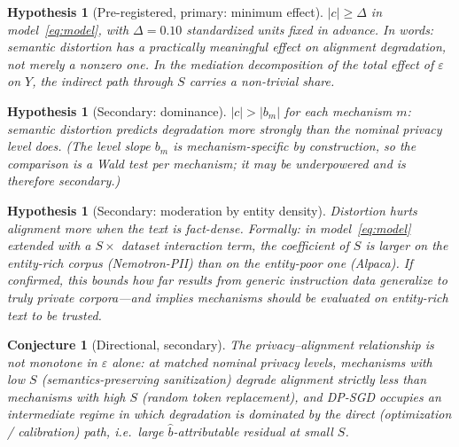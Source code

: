 \documentclass{article}
\theoremstyle{definition}
\theoremstyle{plain}
\newtheorem{conjecture}[theorem]{Conjecture}
\newtheorem{hypothesis}[theorem]{Hypothesis}
\theoremstyle{remark}
\newcommand{\eps}{\varepsilon}
\newcommand{\Sdist}{S}
\begin{document}
\begin{hypothesis}[Pre-registered, primary: minimum effect]\label{hyp:main}
$|c| \ge \Delta$ in model~\eqref{eq:model}, with $\Delta = 0.10$
standardized units fixed in advance. In words: semantic distortion has a
practically meaningful effect on alignment degradation, not merely a nonzero
one. In the mediation decomposition of the total effect of $\eps$ on $Y$, the
indirect path through $\Sdist$ carries a non-trivial share.
\end{hypothesis}

\begin{hypothesis}[Secondary: dominance]\label{hyp:dom}
$|c| > |b_{m}|$ for each mechanism $m$: semantic distortion
predicts degradation more strongly than the nominal privacy level does.
(The level slope $b_m$ is mechanism-specific by construction, so the
comparison is a Wald test per mechanism; it may be underpowered and is
therefore secondary.)
\end{hypothesis}

\begin{hypothesis}[Secondary: moderation by entity density]\label{hyp:mod}
Distortion hurts alignment more when the text is fact-dense. Formally: in
model~\eqref{eq:model} extended with a $\Sdist \times$ dataset interaction
term, the coefficient of $\Sdist$ is larger on the entity-rich corpus
(Nemotron-PII) than on the entity-poor one (Alpaca). If confirmed, this
bounds how far results from generic instruction data generalize to truly
private corpora---and implies mechanisms should be evaluated on entity-rich
text to be trusted.
\end{hypothesis}

\begin{conjecture}[Directional, secondary]\label{conj:shape}
The privacy--alignment relationship is not monotone in $\eps$ alone: at matched
nominal privacy levels, mechanisms with low $\Sdist$ (semantics-preserving
sanitization) degrade alignment
strictly less than mechanisms with high $\Sdist$ (random token replacement),
and DP-SGD occupies an intermediate
regime in which degradation is dominated by the \emph{direct} (optimization /
calibration) path, i.e.\ large $\hat b$-attributable residual at small
$\Sdist$.
\end{conjecture}
\end{document}
